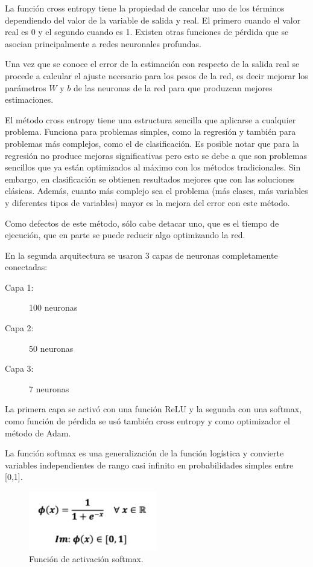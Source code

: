 \documentclass[runningheads]{llncs}
\begin{document}
La funci{\'o}n cross entropy tiene la propiedad de cancelar uno de los t{\'e}rminos dependiendo del valor de la variable de salida y real. El primero cuando el valor real es 0 y el segundo cuando es 1. Existen otras funciones de p{\'e}rdida que se asocian principalmente a redes neuronales profundas.

Una vez que se conoce el error de la estimaci{\'o}n con respecto de la salida real se procede a calcular el ajuste necesario para los pesos de la red, es decir mejorar los par{\'a}metros $W$ y $b$ de las neuronas de la red para que produzcan mejores estimaciones.

El m{\'e}todo cross entropy tiene una estructura sencilla que aplicarse a cualquier problema. Funciona para problemas simples, como la regresi{\'o}n y tambi{\'e}n para problemas m{\'a}s complejos, como el de clasificaci{\'o}n. Es posible notar que para la regresi{\'o}n no produce mejoras significativas pero esto se debe a que son problemas sencillos que ya est{\'a}n optimizados al m{\'a}ximo con los m{\'e}todos tradicionales. Sin embargo, en clasificaci{\'o}n se obtienen resultados mejores que con las soluciones cl{\'a}sicas. Adem{\'a}s, cuanto m{\'a}s complejo sea el problema (m{\'a}s clases, m{\'a}s variables y diferentes tipos de variables) mayor es la mejora del error con este m{\'e}todo.

Como defectos de este m{\'e}todo, s{\'o}lo cabe detacar uno, que es el tiempo de ejecuci{\'o}n, que en parte se puede reducir algo optimizando la red.

En la segunda arquitectura se usaron 3 capas de neuronas completamente conectadas:

\begin{description}
	\item[Capa 1:] 100 neuronas
	\item[Capa 2:] 50 neuronas
	\item[Capa 3:] 7 neuronas
\end{description}

La primera capa se activ{\'o} con una función ReLU y la segunda con una softmax, como funci{\'o}n de p{\'e}rdida se us{\'o} tambi{\'e}n cross entropy y como optimizador el m{\'e}todo de Adam.

La funci{\'o}n softmax es una generalizaci{\'o}n de la funci{\'o}n log{\'i}stica y convierte variables independientes de rango casi infinito en probabilidades simples entre [0,1].

\begin{figure}
	\begin{center}
		\includegraphics[width=0.5\textwidth]{images/softmax.png}
		\caption{Funci{\'o}n de activaci{\'o}n softmax.} \label{softmax}
	\end{center}
\end{figure}
\end{document}
